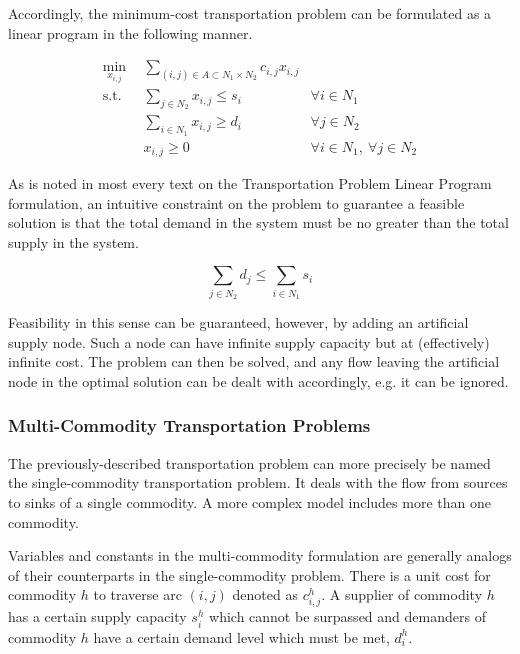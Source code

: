 Accordingly, the minimum-cost transportation problem can be formulated as a
linear program in the following manner.

\begin{subequations}\label{eqs:xport}
  \begin{align}
    \min_{x_{i,j}} \:\: & 
    \sum_{(i, j) \in A \subset N_1 \times N_2} c_{i,j} x_{i,j}
    & \label{eqs:xport_obj} \\
    \text{s.t.} \:\: &
    \sum_{j \in N_2} x_{i,j} \leq s_i
    & \forall i \in N_1  \\
    &
    \sum_{i \in N_1} x_{i,j} \geq d_i
    & \forall j \in N_2  \\
    &
    x_{i,j} \geq 0
    & \forall i \in N_1, \: \forall j \in N_2 \label{eqs:xport_x}
  \end{align}
\end{subequations}

As is noted in most every text on the Transportation Problem Linear Program
formulation, an intuitive constraint on the problem to guarantee a feasible
solution is that the total demand in the system must be no greater than the
total supply in the system.

\begin{equation}
  \sum_{j \in N_2} d_j \leq \sum_{i \in N_1} s_i
\end{equation}

Feasibility in this sense can be guaranteed, however, by adding an artificial
supply node. Such a node can have infinite supply capacity but at (effectively)
infinite cost. The problem can then be solved, and any flow leaving the
artificial node in the optimal solution can be dealt with accordingly, e.g. it
can be ignored.

\subsubsection{Multi-Commodity Transportation Problems}
The previously-described transportation problem can more precisely be named the
single-commodity transportation problem. It deals with the flow from sources to
sinks of a single commodity. A more complex model includes more than one
commodity.

Variables and constants in the multi-commodity formulation are generally analogs
of their counterparts in the single-commodity problem. There is a unit cost for
commodity $h$ to traverse arc $(i,j)$ denoted as $c_{i,j}^{h}$. A supplier of
commodity $h$ has a certain supply capacity $s_i^h$ which cannot be surpassed
and demanders of commodity $h$ have a certain demand level which must be met,
$d_i^h$.


